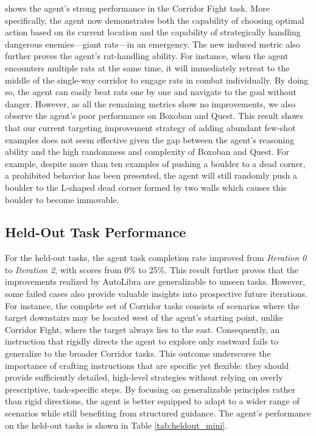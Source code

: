 \begin{flushleft}
	shows the agent's strong performance in the Corridor Fight task. More
	specifically, the agent now demonstrates both the capability of choosing optimal
	action based on its current location and the capability of strategically handling
	dangerous enemies—giant rats—in an emergency. The new induced metric also
	further proves the agent's rat-handling ability. For instance, when the agent
	encounters multiple rats at the same time, it will immediately retreat to the middle
	of the single-way corridor to engage rats in combat individually. By doing so,
	the agent can easily beat rats one by one and navigate to the goal without danger.
	However, as all the remaining metrics show no improvements, we also observe
	the agent's poor performance on Boxoban and Quest. This result shows that our current
	targeting improvement strategy of adding abundant few-shot examples does not seem
	effective given the gap between the agent's reasoning ability and the high randomness
	and complexity of Boxoban and Quest. For example, despite more than ten examples
	of pushing a boulder to a dead corner, a prohibited behavior has been
	presented, the agent will still randomly push a boulder to the L-shaped dead corner
	formed by two walls which causes this boulder to become immovable.

	\subsection{Held-Out Task Performance}
	For the held-out tasks, the agent task completion rate improved from \emph{Iteration
	0} to \emph{Iteration 2}, with scores from 0\% to 25\%. This result further
	proves that the improvements realized by AutoLibra are generalizable to unseen
	tasks. However, some failed cases also provide valuable insights into
	prospective future iterations. For instance, the complete set of Corridor
	tasks consists of scenarios where the target downstairs may be located west of
	the agent’s starting point, unlike Corridor Fight, where the target always
	lies to the east. Consequently, an instruction that rigidly directs the agent
	to explore only eastward fails to generalize to the broader Corridor tasks. This
	outcome underscores the importance of crafting instructions that are specific yet
	flexible: they should provide sufficiently detailed, high-level strategies without
	relying on overly prescriptive, task-specific steps. By focusing on generalizable
	principles rather than rigid directions, the agent is better equipped to adapt
	to a wider range of scenarios while still benefiting from structured guidance.
	The agent's performance on the held-out tasks is shown in Table \ref{tab:heldout_mini}.
\end{flushleft}